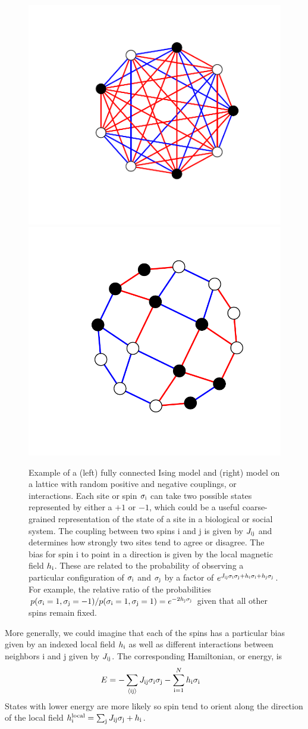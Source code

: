 \documentclass[aps,prl,twocolumn]{revtex4-1}
\begin{document}
\begin{figure}[tb]\centering
	\includegraphics[width=.45\linewidth,clip,trim={100 70 70 60}]{images/ising_example}
	\includegraphics[width=.45\linewidth,clip,trim={60 50 50 45}]{images/ising_example_lattice}
\caption{Example of a (left) fully connected Ising model and (right) model on a lattice with random positive and negative couplings, or interactions. Each site or spin $\sigma_{\rm i}$ can take two possible states represented by either a $+1$ or $-1$, which could be a useful coarse-grained representation of the state of a site in a biological or social system. The coupling between two spins i and j is given by $J_{\rm ij}$ and determines how strongly two sites tend to agree or disagree.
The bias for spin i to point in a direction is given by the local magnetic field $h_{\rm i}$.
These are related to the probability of observing a particular configuration of $\sigma_{\rm i}$ and $\sigma_{\rm j}$ by a factor of $e^{J_{\rm ij}\sigma_{\rm i}\sigma_{\rm j} + h_{\rm i}\sigma_{\rm i} + h_{\rm j}\sigma_{\rm j}}$. For example, the relative ratio of the probabilities $p(\sigma_{\rm i}=1,\sigma_{\rm j}=-1)/p(\sigma_{\rm i}=1,\sigma_{\rm j}=1) = e^{-2h_{\rm j}\sigma_{\rm j}}$ given that all other spins remain fixed.}
\label{gr:ising}
\end{figure}

More generally, we could imagine that each of the spins has a particular bias given by an indexed local field $h_{\rm i}$ as well as different interactions between neighbors i and j given by $J_{\rm ij}$. The corresponding Hamiltonian, or energy, is
\begin{align}
	E &= -\sum_{\rm \left<ij\right>} J_{\rm ij}\sigma_{\rm i}\sigma_{\rm j} -\sum_{\rm i=1}^Nh_{\rm i}\sigma_{\rm i}
\end{align}
States with lower energy are more likely so spin tend to orient along the direction of the local field $h_{\rm i}^{\rm local} = \sum_{\rm j}J_{\rm ij}\sigma_{\rm j} +h_{\rm i}$. 
\end{document}
